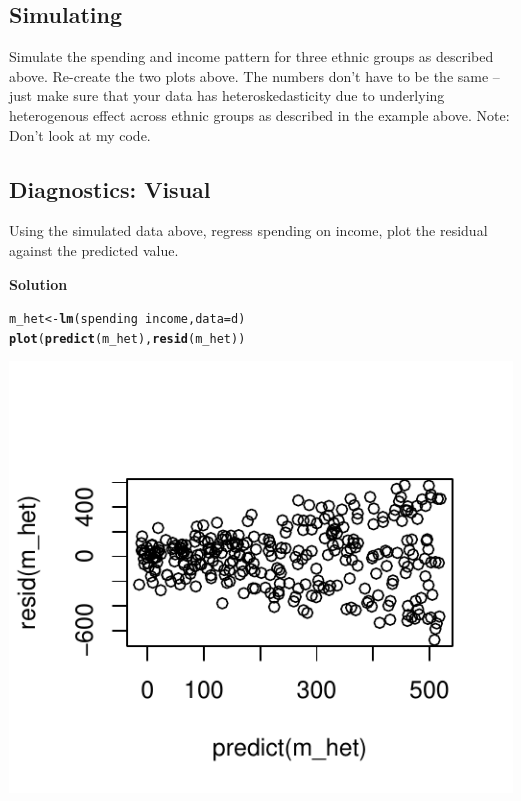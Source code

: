 \documentclass{article}\usepackage[]{graphicx}\usepackage[]{color}
\makeatletter
\def\maxwidth{ %
  \ifdim\Gin@nat@width>\linewidth
    \linewidth
  \else
    \Gin@nat@width
  \fi
}
\newcommand{\hlopt}[1]{\textcolor[rgb]{0,0,0}{#1}}%
\newcommand{\hlstd}[1]{\textcolor[rgb]{0.345,0.345,0.345}{#1}}%
\newcommand{\hlkwb}[1]{\textcolor[rgb]{0.69,0.353,0.396}{#1}}%
\newcommand{\hlkwc}[1]{\textcolor[rgb]{0.333,0.667,0.333}{#1}}%
\newcommand{\hlkwd}[1]{\textcolor[rgb]{0.737,0.353,0.396}{\textbf{#1}}}%
\newenvironment{kframe}{%
 \def\at@end@of@kframe{}%
 \ifinner\ifhmode%
  \def\at@end@of@kframe{\end{minipage}}%
  \begin{minipage}{\columnwidth}%
 \fi\fi%
 \def\FrameCommand##1{\hskip\@totalleftmargin \hskip-\fboxsep
 \colorbox{shadecolor}{##1}\hskip-\fboxsep
     \hskip-\linewidth \hskip-\@totalleftmargin \hskip\columnwidth}%
 \MakeFramed {\advance\hsize-\width
   \@totalleftmargin\z@ \linewidth\hsize
   \@setminipage}}%
 {\par\unskip\endMakeFramed%
 \at@end@of@kframe}
\newenvironment{knitrout}{}{} %
\makeatother
\begin{document}
\subsection{Simulating}

Simulate the spending and income pattern for three ethnic groups as described above. Re-create the two plots above. The numbers don't have to be the same -- just make sure that your data has heteroskedasticity due to underlying heterogenous effect across ethnic groups as described in the example above. Note: Don't look at my code.

\subsection{Diagnostics: Visual}

Using the simulated data above, regress spending on income, plot the residual against the predicted value.

\textbf{Solution}

\begin{knitrout}
\color{fgcolor}\begin{kframe}
\begin{alltt}
\hlstd{m_het} \hlkwb{<-} \hlkwd{lm}\hlstd{(spending} \hlopt{~} \hlstd{income,} \hlkwc{data} \hlstd{= d)}
\hlkwd{plot}\hlstd{(}\hlkwd{predict}\hlstd{(m_het),} \hlkwd{resid}\hlstd{(m_het))}
\end{alltt}
\end{kframe}
\includegraphics[width=\maxwidth]{figure/unnamed-chunk-4-1} 

\end{knitrout}
\end{document}
